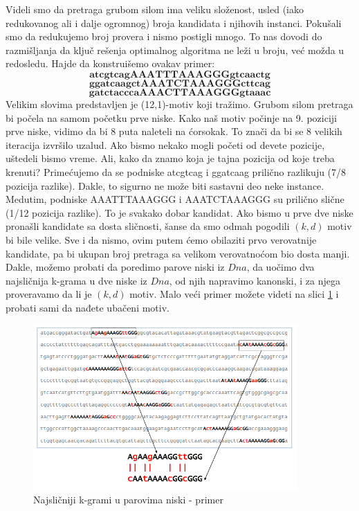 Videli smo da pretraga grubom silom ima veliku složenost, usled (iako redukovanog ali i dalje ogromnog) broja kandidata i njihovih instanci. Pokušali smo da redukujemo broj provera i nismo postigli mnogo. To nas dovodi do razmišljanja da ključ rešenja optimalnog algoritma ne leži u broju, već možda u redosledu. Hajde da konstruišemo ovakav primer: \\
$$ \textbf{atcgtcagAAATTTAAAGGGgtcaactg} $$
$$ \textbf{ggatcaagctAAATCTAAAGGGcttcag} $$
$$ \textbf{gatctacccaAAACTTAAAGGGgtaaac} $$
Velikim slovima predstavljen je (12,1)-motiv koji tražimo. Grubom silom pretraga bi počela na samom početku prve niske. Kako naš motiv počinje na 9. poziciji prve niske, vidimo da bi 8 puta naleteli na ćorsokak. To znači da bi se 8 velikih iteracija izvršilo uzalud. Ako bismo nekako mogli početi od devete pozicije, uštedeli bismo vreme. Ali, kako da znamo koja je tajna pozicija od koje treba krenuti? Primećujemo da se podniske atcgtcag i ggatcaag prilično razlikuju (7/8 pozicija razlike). Dakle, to sigurno ne može biti sastavni deo neke instance. Medutim, podniske AAATTTAAAGGG i AAATCTAAAGGG su prilično slične (1/12 pozicija razlike). To je svakako dobar kandidat. Ako bismo u prve dve niske pronašli kandidate sa dosta sličnosti, šanse da smo odmah pogodili $(k,d)$ motiv bi bile velike. Sve i da nismo, ovim putem ćemo obilaziti prvo verovatnije kandidate, pa bi ukupan broj pretraga sa velikom verovatnoćom bio dosta manji. Dakle, možemo probati da poredimo parove niski iz $Dna$, da uočimo dva najsličnija k-grama u dve niske iz $Dna$, od njih napravimo kanonski, i za njega proveravamo da li je $(k, d)$ motiv. Malo veći primer možete videti na slici \ref{slika: najslicniji kgrami} i probati sami da nađete ubačeni motiv.

\begin{figure}[h]
\centering
\includegraphics[width=0.9\textwidth]{poglavlja/2/slike/25.PNG}
\caption{Najsličniji k-grami u parovima niski - primer}
\label{slika: najslicniji kgrami}
\end{figure}

